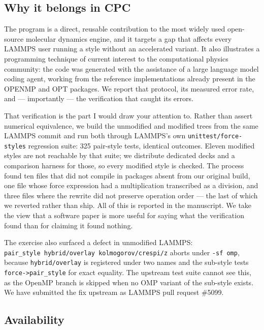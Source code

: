 \documentclass[
  11pt,
]{article}
\begin{document}
\subsection{Why it belongs in CPC}\label{why-it-belongs-in-cpc}

The program is a direct, reusable contribution to the most widely used
open-source molecular dynamics engine, and it targets a gap that affects
every LAMMPS user running a style without an accelerated variant. It
also illustrates a programming technique of current interest to the
computational physics community: the code was generated with the
assistance of a large language model coding agent, working from the
reference implementations already present in the OPENMP and OPT
packages. We report that protocol, its measured error rate, and ---
importantly --- the verification that caught its errors.

That verification is the part I would draw your attention to. Rather
than assert numerical equivalence, we build the unmodified and modified
trees from the same LAMMPS commit and run both through LAMMPS's own
\texttt{unittest/force-styles} regression suite: 325 pair-style tests,
identical outcomes. Eleven modified styles are not reachable by that
suite; we distribute dedicated decks and a comparison harness for those,
so every modified style is checked. The process found ten files that did
not compile in packages absent from our original build, one file whose
force expression had a multiplication transcribed as a division, and
three files where the rewrite did not preserve operation order --- the
last of which we reverted rather than ship. All of this is reported in
the manuscript. We take the view that a software paper is more useful
for saying what the verification found than for claiming it found
nothing.

The exercise also surfaced a defect in unmodified LAMMPS:
\texttt{pair\_style\ hybrid/overlay\ kolmogorov/crespi/z} aborts under
\texttt{-sf\ omp}, because \texttt{hybrid/overlay} is registered under
two names and the sub-style tests
\texttt{force-\textgreater{}pair\_style} for exact equality. The
upstream test suite cannot see this, as the OpenMP branch is skipped
when no OMP variant of the sub-style exists. We have submitted the fix
upstream as LAMMPS pull request \#5099.

\subsection{Availability}\label{availability}
\end{document}
